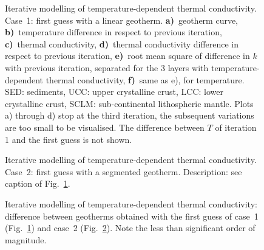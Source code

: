 \begin{subappendices}
\begin{figure}
	\begin{adjustbox}{center}
	\end{adjustbox}
	\caption[Iterative modelling of temperature-dependent thermal conductivity: linear geotherm.]{Iterative modelling of temperature-dependent thermal conductivity. Case~1: first guess with a linear geotherm. \textbf{a)}~geotherm curve, \textbf{b)}~temperature difference in respect to previous iteration, \textbf{c)}~thermal conductivity, \textbf{d)}~thermal conductivity difference in respect to previous iteration, \textbf{e)}~root mean square of difference in $k$ with previous iteration, separated for the 3 layers with temperature-dependent thermal conductivity, \textbf{f)}~same as e), for temperature. SED: sediments, UCC: upper crystalline crust, LCC: lower crystalline crust, SCLM: sub-continental lithospheric mantle.
	Plots a) through d) stop at the third iteration, the subsequent variations are too small to be visualised. The difference between $T$ of iteration 1 and the first guess is not shown.}
	\label{fig:kITN1}
\end{figure}

\begin{figure}
	\begin{adjustbox}{center}
	\end{adjustbox}
	\caption[Iterative modelling of temperature-dependent thermal conductivity: segmented geotherm.]{Iterative modelling of temperature-dependent thermal conductivity. Case~2: first guess with a segmented geotherm.
	Description: see caption of Fig.~\ref{fig:kITN1}.}
	\label{fig:kITN2}
\end{figure}

\begin{figure}
	\begin{adjustbox}{center}
	\end{adjustbox}
	\caption[Iterative modelling of temperature-dependent thermal conductivity: differences.]{Iterative modelling of temperature-dependent thermal conductivity: difference between geotherms obtained with the first guess of case~1 (Fig.~\ref{fig:kITN1}) and case~2 (Fig.~\ref{fig:kITN2}).
	Note the less than significant order of magnitude.}
	\label{fig:kITNdiff}
\end{figure}


\end{subappendices}
